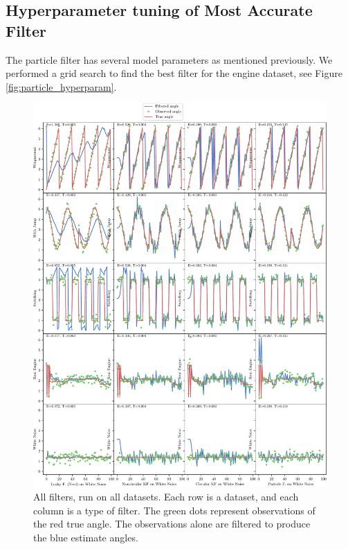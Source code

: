 \documentclass[11pt]{amsart}
\begin{document}
\subsection{Hyperparameter tuning of Most Accurate Filter}

The particle filter has several model parameters as mentioned previously. We performed a grid search
to find the best filter for the engine dataset, see Figure \ref{fig:particle_hyperparam}.


\begin{figure}[htp]
    \centering
    \includegraphics[width=1\textwidth]{actual_paper_graphs/all.pdf}\hfill
    \caption{All filters, run on all datasets. Each row is a dataset, and each column is a type of filter. The green dots represent observations of the red true angle. The observations alone are filtered to produce the blue estimate angles.}
    \label{fig:all_filters}
\end{figure}
\end{document}
